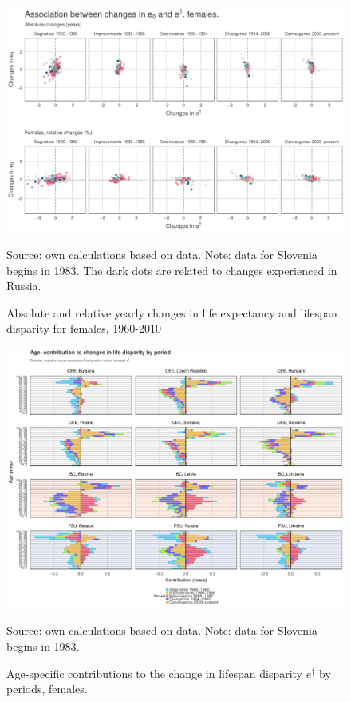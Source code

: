 \documentclass{article}
\begin{document}
\begin{figure}[h!]
\centering
\caption{Absolute and relative yearly changes in life expectancy and lifespan disparity for females, 1960-2010}
\begin{center}
\includegraphics[scale=.47]{Figures/changes_females.pdf}
\end{center}
Source: own calculations based on \citet{HMD} data. Note: data for Slovenia begins in 1983. The dark dots are related to changes experienced in Russia.
\end{figure}

\newpage

\begin{figure}[h!]
\caption{Age-specific contributions to the change in lifespan disparity $e^\dagger$ by periods, females.}
\centering
\begin{center}
\includegraphics[scale=.46]{Figures/Age_ed_decomp_Females.pdf}
\end{center}
Source: own calculations based on \citet{HMD} data. Note: data for Slovenia begins in 1983.
\end{figure}
\end{document}
